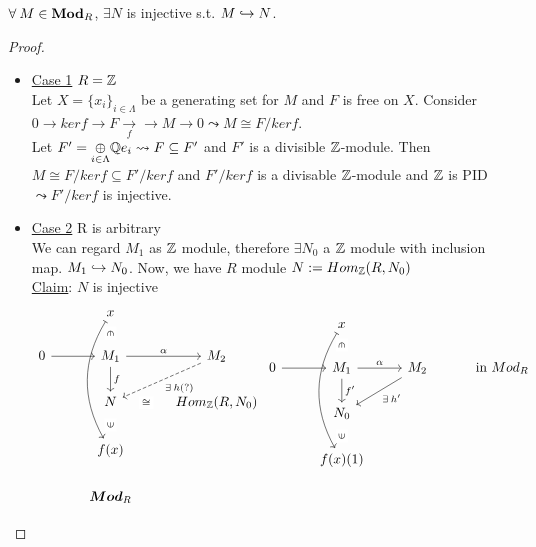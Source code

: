 \begin{theorem}
 $\forall M \in \Mod_R$, $\exists N$ is injective s.t. $M \toone N$.
 \begin{proof} $ $
   \begin{itemize}
      \item \underline{Case 1} $R = \Zb$ \\
        Let $X = \{x_i\}_{i \in \Lambda}$ be a generating set for $M$ 
        and $F$ is free on $X$. Consider $0 \to kerf \to F 
        \underset{f}{\to} \to M \to 0 \leadsto M \cong F / kerf$. \\
        Let $F' = \underset{i \in \Lambda}{\oplus} \Qb e_i \leadsto
        F \subseteq F'$ and $F'$ is a divisible $\Zb$-module. Then
        $M \cong F/kerf \subseteq F'/kerf$ and $F'/kerf$ is a 
        divisable $\Zb$-module and $\Zb$ is PID $\leadsto F'/kerf$
        is injective.
      \item \underline{Case 2} R is arbitrary \\
        We can regard $M_1$ as $\Zb$ module, therefore $\exists N_0$ a 
        $\Zb$ module with inclusion map. $M_1 \toone N_0$. 
        Now, we have $R$ module $N := Hom_\Zb(R, N_0)$ \\
        \underline{Claim}: $N$ is injective
        $$
          \begin{tikzcd}[contains/.style = {draw=none, 
          "\in" description ,sloped}]
                      & x \ar[d, contains] \ar[ddd, mapsto, bend right] \\
            0 \ar[r]  & M_1 \ar[r,"\alpha"] \ar[d, "f"] & M_2 \ar[ld, 
            "\exists h (?)",dashed] \\
                      & N \ar[r, draw=none, "\cong" description]&  
                      Hom_\Zb(R, N_0) \\
                      & f(x) \ar[u, contains] \\
                      & \boldsymbol{Mod}_R
          \end{tikzcd} 
          \begin{tikzcd}[contains/.style = {draw=none, 
          "\in" description ,sloped}]
                      & x \ar[d, contains] \ar[ddd, mapsto, bend right] \\
            0 \ar[r]  & M_1 \ar[r,"\alpha"] \ar[d, "f'"] & M_2 \ar[ld, 
            "\exists h'"] & \text{ in } Mod_R\\
                      & N_0 \\
                      & f(x)(1) \ar[u, contains] \\

\end{tikzcd}$$
\end{itemize}
\end{proof}
\end{theorem}
